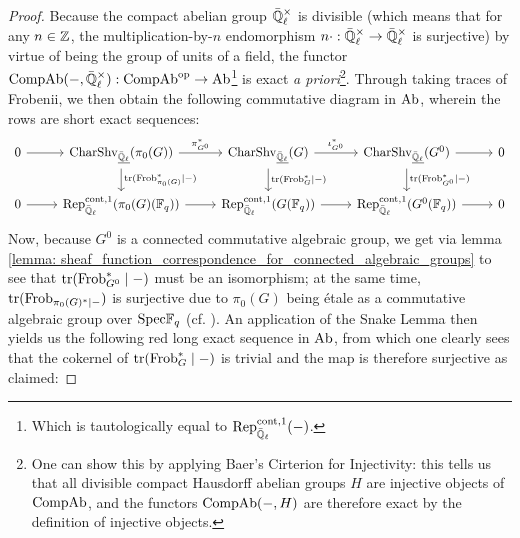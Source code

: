                 \begin{proof}
                    Because the compact abelian group $\bar{\Q}_{\ell}^{\x}$ is divisible (which means that for any $n \in \mathbb{Z}$, the multiplication-by-$n$ endomorphism $n \cdot: \bar{\Q}_{\ell}^{\x} \to \bar{\Q}_{\ell}^{\x}$ is surjective) by virtue of being the group of units of a field, the functor $\Comp\Ab(-, \bar{\Q}_{\ell}^{\x}): \Comp\Ab^{\op} \to \Ab$\footnote{Which is tautologically equal to $\mathrm{Rep}^{\mathrm{cont}, 1}_{\bar{\mathbb{Q}}_{\ell}}(-)$.} is exact \textit{a priori}\footnote{One can show this by applying Baer's Cirterion for Injectivity: this tells us that all divisible compact Hausdorff abelian groups $H$ are injective objects of $\mathrm{Comp}\mathrm{Ab}$, and the functors $\mathrm{Comp}\mathrm{Ab}(-, H)$ are therefore exact by the definition of injective objects.}. Through taking traces of Frobenii, we then obtain the following commutative diagram in $\mathrm{Ab}$, wherein the rows are short exact sequences:
                        $$
                            \begin{tikzcd}
                            	0 & {\Char\Shv_{\underline{\bar{\Q}_{\ell}}}(\pi_0(G))} & {\Char\Shv_{\underline{\bar{\Q}_{\ell}}}(G)} & {\Char\Shv_{\underline{\bar{\Q}_{\ell}}}(G^0)} & 0 \\
                            	0 & {\Rep^{\cont, 1}_{\bar{\Q}_{\ell}}(\pi_0(G)(\F_q))} & {\Rep^{\cont, 1}_{\bar{\Q}_{\ell}}(G(\F_q))} & {\Rep^{\cont, 1}_{\bar{\Q}_{\ell}}(G^0(\F_q))} & 0
                            	\arrow[from=1-1, to=1-2]
                            	\arrow["{\pi_{G^0}^*}", from=1-2, to=1-3]
                            	\arrow["{\iota_{G^0}^*}", from=1-3, to=1-4]
                            	\arrow[from=1-4, to=1-5]
                            	\arrow[from=2-1, to=2-2]
                            	\arrow[from=2-2, to=2-3]
                            	\arrow[from=2-3, to=2-4]
                            	\arrow[from=2-4, to=2-5]
                            	\arrow["{\trace(\Frob_{\pi_0(G)}^* \mid -)}", from=1-2, to=2-2]
                            	\arrow["{\trace(\Frob_G^* \mid -)}", from=1-3, to=2-3]
                            	\arrow["{\trace(\Frob_{G^0}^* \mid -)}", from=1-4, to=2-4]
                            \end{tikzcd}
                        $$
                    Now, because $G^0$ is a connected commutative algebraic group, we get via lemma \ref{lemma: sheaf_function_correspondence_for_connected_algebraic_groups} to see that $\operatorname{tr}(\mathrm{Frob}_{G^0}^* \mid -)$ must be an isomorphism; at the same time, $\operatorname{tr}(\mathrm{Frob}_{\pi_0(G)^* \mid -})$ is surjective due to $\pi_0(G)$ being \'etale as a commutative algebraic group over $\mathrm{Spec} \mathbb{F}_q$ (cf. \cite[Proposition 2.6]{cunningham_roe_function_sheaf_dictionary_quasi_characters_p_adic_tori}). An application of the Snake Lemma then yields us the following red long exact sequence in $\mathrm{Ab}$, from which one clearly sees that the cokernel of $\operatorname{tr}(\mathrm{Frob}_G^* \mid -)$ is trivial and the map is therefore surjective as claimed:

\end{proof}
